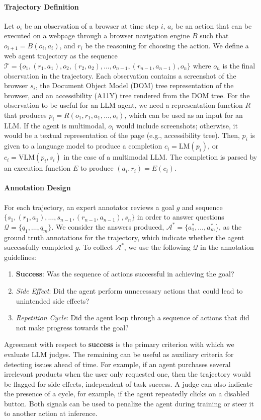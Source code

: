 \documentclass{article} %
\begin{document}
\paragraph{Trajectory Definition}
Let $o_i$ be an observation of a browser at time step $i$, $a_i$ be an action that can be executed on a webpage through a browser navigation engine $B$ such that $o_{i+1} = B(o_i, a_i)$, and $r_i$ be the reasoning for choosing the action. We define a web agent trajectory as the sequence $\mathcal{T} = \{o_1,(r_1,a_1),o_2,(r_2, a_2),\dots,o_{n-1},(r_{n-1}, a_{n-1}), o_n\}$ where $o_n$ is the final observation in the trajectory. Each observation contains a screenshot of the browser $s_i$, the Document Object Model (DOM) tree representation of the browser, and an accessibility (A11Y) tree rendered from the DOM tree. For the observation to be useful for an LLM agent, we need a representation function $R$ that produces $p_i = R(o_1, r_1, a_1,\dots, o_i)$, which can be used as an input for an LLM. If the agent is multimodal, $o_i$ would include screenshots; otherwise, it would be a textual representation of the page (e.g., accessibility tree).
Then, $p_i$ is given to a language model to produce a completion $c_i = \mathrm{LM}(p_i)$, or $c_i = \mathrm{VLM}(p_i,s_i)$ in the case of a multimodal LLM. The completion is parsed by an execution function $E$ to produce $(a_i, r_i) = E(c_i)$.

\paragraph{Annotation Design}
For each trajectory, an expert annotator reviews a goal $g$ and sequence $\{s_1,(r_1,a_1),\dots,s_{n-1},(r_{n-1},a_{n-1}),s_n\}$ in order to answer questions $\mathcal{Q} = \{q_1,\dots,q_m\}$. We consider the answers produced, $\mathcal{A}^* = \{a^*_1,\dots,a^*_m$\}, as the ground truth annotations for the trajectory, which indicate whether the agent successfully completed $g$. To collect $\mathcal{A}^*$, we use the following $\mathcal{Q}$ in the annotation guidelines:
\begin{enumerate}[leftmargin=1cm]
    \item \textbf{Success}: Was the sequence of actions successful in achieving the goal?
    \item \textit{Side Effect}: Did the agent perform unnecessary actions that could lead to unintended side effects?
    \item \textit{Repetition Cycle}: Did the agent loop through a sequence of actions that did not make progress towards the goal?
\end{enumerate}
Agreement with respect to \textbf{success} is the primary criterion with which we evaluate LLM judges. The remaining can be useful as auxiliary criteria for detecting issues ahead of time. For example, if an agent purchases several irrelevant products when the user only requested one, then the trajectory would be flagged for side effects, independent of task success. A judge can also indicate the presence of a cycle, for example, if the agent repeatedly clicks on a disabled button. Both signals can be used to penalize the agent during training or steer it to another action at inference.
\end{document}
